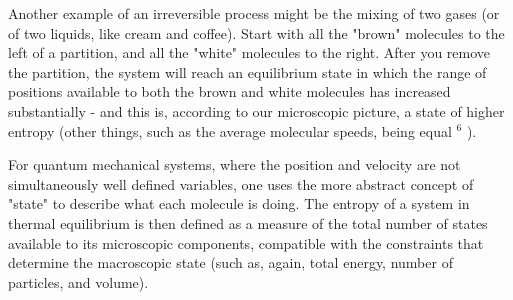 \documentclass[10pt]{article}
\begin{document}
Another example of an irreversible process might be the mixing of two gases (or of two liquids, like cream and coffee). Start with all the "brown" molecules to the left of a partition, and all the "white" molecules to the right. After you remove the partition, the system will reach an equilibrium state in which the range of positions available to both the brown and white molecules has increased substantially - and this is, according to our microscopic picture, a state of higher entropy (other things, such as the average molecular speeds, being equal ${ }^{6}$ ).

For quantum mechanical systems, where the position and velocity are not simultaneously well defined variables, one uses the more abstract concept of "state" to describe what each molecule is doing. The entropy of a system in thermal equilibrium is then defined as a measure of the total number of states available to its microscopic components, compatible with the constraints that determine the macroscopic state (such as, again, total energy, number of particles, and volume).
\end{document}
